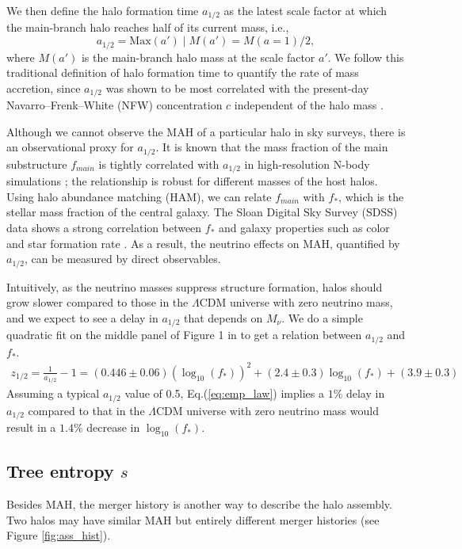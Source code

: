 We then define the halo formation time $a_{1/2}$ as the latest scale factor at which the main-branch halo reaches half of its current mass, i.e.,
\begin{equation}
    a_{1/2} = \mathrm{Max}(a') \mid M(a') = M(a=1)/2,
\end{equation}
where $M(a')$ is the main-branch halo mass at the scale factor $a'$.
We follow this traditional definition of halo formation time to quantify the rate of mass accretion, since $a_{1/2}$ was shown to be most correlated with the present-day Navarro–Frenk–White (NFW) concentration $c$ independent of the halo mass \cite{Kuan}.

Although we cannot observe the MAH of a particular halo in sky surveys, there is an observational proxy for $a_{1/2}$. 
It is known that the mass fraction of the main substructure $f_{main}$ is tightly correlated with $a_{1/2}$ in high-resolution N-body simulations \cite{Wang_2011_2}; 
the relationship is robust for different masses of the host halos. 
Using halo abundance matching (HAM), we can relate $f_{main}$ with $f_*$, which is the stellar mass fraction of the central galaxy.
The Sloan Digital Sky Survey (SDSS) data \cite{Wang_2011} shows a strong correlation between $f_*$ and galaxy properties such as color and star formation rate \cite{Lim_2015}. 
As a result, the neutrino effects on MAH, quantified by $a_{1/2}$, can be measured by direct observables.

Intuitively, as the neutrino masses suppress structure formation, halos should grow slower compared to those in the $\Lambda$CDM universe with zero neutrino mass, and we expect to see a delay in $a_{1/2}$ that depends on $M_\nu$. We do a simple quadratic fit on the middle panel of Figure 1 in \cite{Lim_2015} to get a relation between $a_{1/2}$ and $f_*$.
\begin{align}
\label{eq:emp_law}
     z_{1/2} = \frac{1}{a_{1/2}} -1 = (0.446\pm0.06) (\log_{10}(f_*))^2 + (2.4\pm0.3) \log_{10}(f_*) + (3.9\pm0.3)
\end{align}
Assuming a typical $a_{1/2}$ value of 0.5, Eq.(\ref{eq:emp_law}) implies a $1\%$ delay in $a_{1/2}$ compared to that in the $\Lambda$CDM universe with zero neutrino mass would result in a $1.4\%$ decrease in $\log_{10}(f_*)$.

\subsection{Tree entropy $s$}
Besides MAH, the merger history is another way to describe the halo assembly. Two halos may have similar MAH but entirely different merger histories (see Figure \ref{fig:ass_hist}). 

